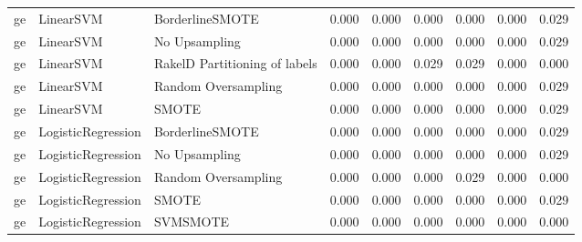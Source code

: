 \begin{tabular}{lllllllll}
      ge &                       LinearSVM &               BorderlineSMOTE &     0.000 &                     0.000 &                 0.000 &                  0.000 &                                   0.000 &     0.029 \\
      ge &                       LinearSVM &                 No Upsampling &     0.000 &                     0.000 &                 0.000 &                  0.000 &                                   0.000 &     0.029 \\
      ge &                       LinearSVM & RakelD Partitioning of labels &     0.000 &                     0.000 &                 0.029 &                  0.029 &                                   0.000 &     0.000 \\
      ge &                       LinearSVM &           Random Oversampling &     0.000 &                     0.000 &                 0.000 &                  0.000 &                                   0.000 &     0.029 \\
      ge &                       LinearSVM &                         SMOTE &     0.000 &                     0.000 &                 0.000 &                  0.000 &                                   0.000 &     0.029 \\
      ge &              LogisticRegression &               BorderlineSMOTE &     0.000 &                     0.000 &                 0.000 &                  0.000 &                                   0.000 &     0.029 \\
      ge &              LogisticRegression &                 No Upsampling &     0.000 &                     0.000 &                 0.000 &                  0.000 &                                   0.000 &     0.029 \\
      ge &              LogisticRegression &           Random Oversampling &     0.000 &                     0.000 &                 0.000 &                  0.029 &                                   0.000 &     0.000 \\
      ge &              LogisticRegression &                         SMOTE &     0.000 &                     0.000 &                 0.000 &                  0.000 &                                   0.000 &     0.029 \\
      ge &              LogisticRegression &                      SVMSMOTE &     0.000 &                     0.000 &                 0.000 &                  0.000 &                                   0.000 &     0.000 \\

\end{tabular}
